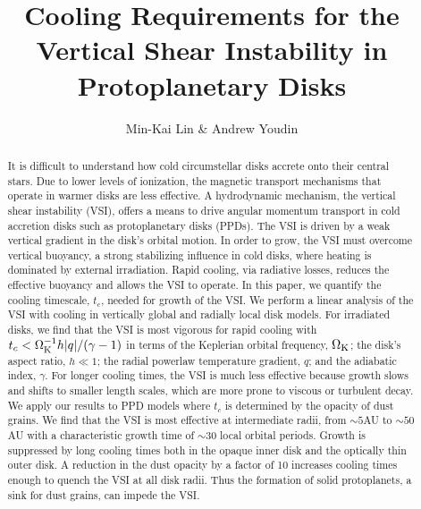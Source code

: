 \documentclass[iop]{emulateapj}
\def \OmK {\Omega_{\rm K}}
\begin{document}
\title{Cooling Requirements for the Vertical Shear Instability 
  in Protoplanetary Disks}
\author{Min-Kai Lin \& Andrew Youdin}

\begin{abstract}
  It is difficult to understand how cold circumstellar disks accrete onto their central stars.  Due to 
  lower levels of ionization, the magnetic transport mechanisms that
  operate in warmer disks are less effective.  
  A hydrodynamic mechanism, the vertical shear instability (VSI), offers a means to drive angular momentum 
  transport in cold accretion disks such as protoplanetary disks (PPDs).  
  The VSI is driven by a weak vertical gradient in the disk's orbital motion.
  In order to grow, the VSI must overcome vertical buoyancy, a strong
  stabilizing influence in cold disks, where  
  heating is dominated by external irradiation.  Rapid cooling, via
  radiative losses, reduces the effective buoyancy 
  and allows the VSI to operate.  In this paper, we quantify the
  cooling timescale, $t_c$, needed for growth of the VSI.
   We perform a linear analysis of the VSI with cooling in
  vertically global and radially local disk models. 
  For irradiated disks, we find that the VSI is most vigorous for
  rapid cooling with $t_c < \OmK^{-1}  h |q| / (\gamma -1)$ 
  in terms of the Keplerian orbital frequency, $\OmK$; the disk's
  aspect ratio, $ h \ll 1$; the radial  
  powerlaw temperature gradient, $q$; and the adiabatic index,
  $\gamma$.  For longer cooling times, the VSI  
  is much less effective because growth slows and shifts to smaller length scales, which are more prone to 
  viscous or turbulent decay.  We apply our results to PPD models 
  where $t_c$ is determined by the opacity of dust grains.  We
  find that the VSI is most effective at intermediate radii, from $\sim 5$AU to $\sim 50$AU with a
  characteristic growth time of $\sim 30$ local orbital periods.
  Growth is suppressed by long cooling times both in the opaque  
  inner disk and the optically thin outer disk.  A reduction in the
  dust opacity by a factor of 10 increases cooling times  
  enough to quench the VSI at all disk radii.  Thus the formation of
  solid protoplanets, a sink for dust grains, can impede the VSI. 
\end{abstract}
\end{document}

